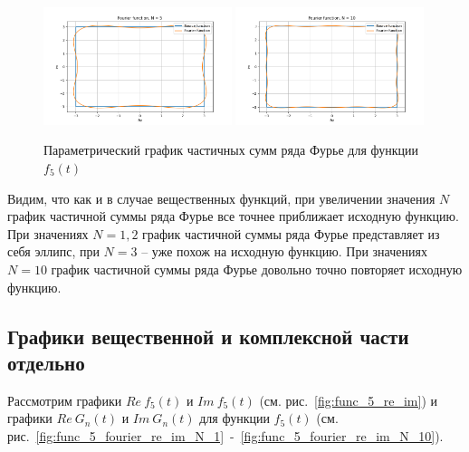 \begin{figure}[ht!]
    \includegraphics[width=0.49\textwidth]{media/plots/func_5_N_5.png}
    \includegraphics[width=0.49\textwidth]{media/plots/func_5_N_10.png}
    \caption{Параметрический график частичных сумм ряда Фурье для функции $f_5(t)$}
    \label{fig:func_5_plot}
\end{figure}

Видим, что как и в случае вещественных функций, при увеличении значения $N$ график частичной суммы ряда Фурье все точнее приближает исходную функцию. 
При значениях $N = 1, 2$ график частичной суммы ряда Фурье представляет из себя эллипс, при $N = 3$ -- уже похож на исходную функцию.
При значениях $N = 10$ график частичной суммы ряда Фурье довольно точно повторяет исходную функцию.

\subsection{Графики вещественной и комплексной части отдельно}

Рассмотрим графики $Re~f_5(t)$ и $Im~f_5(t)$ (см. рис.~\ref{fig:func_5_re_im}) и графики $Re~G_n(t)$ и $Im~G_n(t)$  для функции $f_5(t)$ (см. рис.~\ref{fig:func_5_fourier_re_im_N_1}~-~\ref{fig:func_5_fourier_re_im_N_10}).

